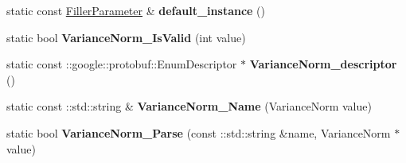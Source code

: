 \begin{DoxyCompactItemize}
static const \mbox{\hyperlink{classcaffe_1_1_filler_parameter}{Filler\+Parameter}} \& {\bfseries default\+\_\+instance} ()
\item 
\mbox{\label{classcaffe_1_1_filler_parameter_ae221621b63dd60962d913c4b261c34ea}} 
static bool {\bfseries Variance\+Norm\+\_\+\+Is\+Valid} (int value)
\item 
\mbox{\label{classcaffe_1_1_filler_parameter_a0ad2e31a8c01f3b407854ddf0609734d}} 
static const \+::google\+::protobuf\+::\+Enum\+Descriptor $\ast$ {\bfseries Variance\+Norm\+\_\+descriptor} ()
\item 
\mbox{\label{classcaffe_1_1_filler_parameter_a4735cb33c39453c184a0b3a13590a8db}} 
static const \+::std\+::string \& {\bfseries Variance\+Norm\+\_\+\+Name} (Variance\+Norm value)
\item 
\mbox{\label{classcaffe_1_1_filler_parameter_a0c9cba0fb401bd9b7c85f17fe8631ac3}} 
static bool {\bfseries Variance\+Norm\+\_\+\+Parse} (const \+::std\+::string \&name, Variance\+Norm $\ast$value)
\end{DoxyCompactItemize}
